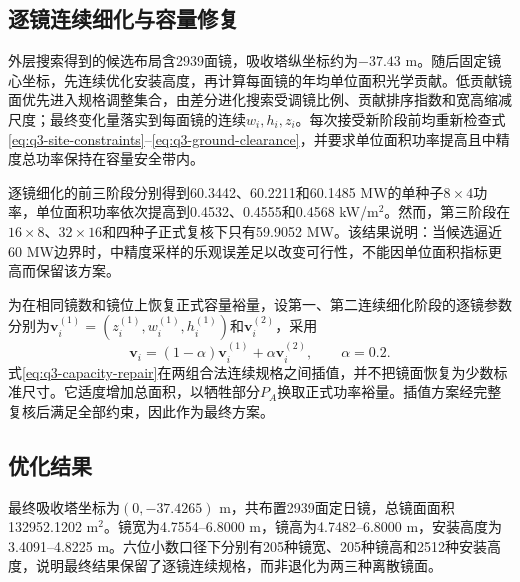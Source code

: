 \subsection{逐镜连续细化与容量修复}

外层搜索得到的候选布局含2939面镜，吸收塔纵坐标约为$-37.43$ m。随后固定镜心坐标，先连续优化安装高度，再计算每面镜的年均单位面积光学贡献。低贡献镜面优先进入规格调整集合，由差分进化搜索受调镜比例、贡献排序指数和宽高缩减尺度；最终变化量落实到每面镜的连续$w_i,h_i,z_i$。每次接受新阶段前均重新检查式\eqref{eq:q3-site-constraints}--\eqref{eq:q3-ground-clearance}，并要求单位面积功率提高且中精度总功率保持在容量安全带内。

逐镜细化的前三阶段分别得到60.3442、60.2211和60.1485 MW的单种子$8\times4$功率，单位面积功率依次提高到0.4532、0.4555和0.4568 kW/m$^2$。然而，第三阶段在$16\times8$、$32\times16$和四种子正式复核下只有59.9052 MW。该结果说明：当候选逼近60 MW边界时，中精度采样的乐观误差足以改变可行性，不能因单位面积指标更高而保留该方案。

为在相同镜数和镜位上恢复正式容量裕量，设第一、第二连续细化阶段的逐镜参数分别为$\boldsymbol v_i^{(1)}=(z_i^{(1)},w_i^{(1)},h_i^{(1)})$和$\boldsymbol v_i^{(2)}$，采用
\begin{equation}
 \boldsymbol v_i=(1-\alpha)\boldsymbol v_i^{(1)}
 +\alpha\boldsymbol v_i^{(2)},\qquad \alpha=0.2.
 \label{eq:q3-capacity-repair}
\end{equation}
式\eqref{eq:q3-capacity-repair}在两组合法连续规格之间插值，并不把镜面恢复为少数标准尺寸。它适度增加总面积，以牺牲部分$P_A$换取正式功率裕量。插值方案经完整复核后满足全部约束，因此作为最终方案。

\subsection{优化结果}

最终吸收塔坐标为$(0,-37.4265)$ m，共布置2939面定日镜，总镜面面积132952.1202 m$^2$。镜宽为4.7554--6.8000 m，镜高为4.7482--6.8000 m，安装高度为3.4091--4.8225 m。六位小数口径下分别有205种镜宽、205种镜高和2512种安装高度，说明最终结果保留了逐镜连续规格，而非退化为两三种离散镜面。

